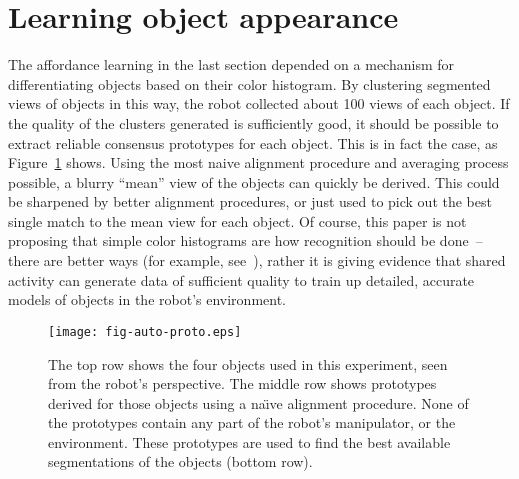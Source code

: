 
\section{Learning object appearance}

The affordance learning in the last section depended on a mechanism
for differentiating objects based on their color histogram.
%
By clustering segmented views of objects in this way,
the robot collected about 100 views of each object.  
If the quality of the clusters generated is sufficiently good, it
should be possible to extract reliable consensus prototypes for each 
object.  This is in fact the case, as Figure~\ref{fig:auto-proto}
shows.  Using the most naive alignment procedure and averaging
process possible, a blurry ``mean'' view of the objects can
quickly be derived.  This could be sharpened by better alignment
procedures, or just used to pick out the best single match
to the mean view for each object.
%
Of course, this paper is not proposing that simple color histograms
are how recognition should be done~-- there are better ways (for
example, see~\cite{schiele00recognition}), rather it is giving
evidence that shared activity can generate data of sufficient quality
to train up detailed, accurate models of objects in the robot's 
environment.

%
\begin{figure}[tb]
\begin{center}
\texttt{[image: fig-auto-proto.eps]}
\caption{ 
\label{fig:auto-proto}
%
The top row shows the four objects used in this 
experiment, seen from the robot's perspective.  The 
middle row shows prototypes derived for those objects
using a na\"{\i}ve alignment procedure.  
None of the prototypes contain
any part of the robot's manipulator, or the 
environment.  These prototypes are used 
to find the best available segmentations
of the objects (bottom row).
%
}
\end{center}
\end{figure}


